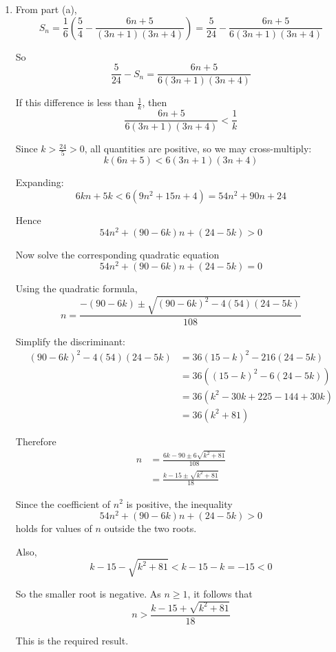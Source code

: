 \documentclass[leqno]{article}
\begin{document}
\begin{enumerate}[
  label=\textbf{\arabic*.},
  leftmargin=*,
  topsep=0pt,
  partopsep=0pt,
  parsep=0pt
]
\begin{tcolorbox}[colback=white, colframe=scarlet, title={\textbf{Solution}}, breakable, grow to left by=6mm, grow to right by=10mm]
\begin{enumerate}[label=\textbf{(\alph*)}]
Hence
\[
S_n=\frac{n(15n+17)}{8(3n+1)(3n+4)}
\]

  \item From part (a),
\[
S_n=\frac16\left(\frac54-\frac{6n+5}{(3n+1)(3n+4)}\right)
=\frac5{24}-\frac{6n+5}{6(3n+1)(3n+4)}
\]

So
\[
\frac5{24}-S_n=\frac{6n+5}{6(3n+1)(3n+4)}
\]

If this difference is less than \(\frac1k\), then
\[
\frac{6n+5}{6(3n+1)(3n+4)}<\frac1k
\]

Since \(k>\frac{24}{5}>0\), all quantities are positive, so we may cross-multiply:
\[
k(6n+5)<6(3n+1)(3n+4)
\]

Expanding:
\[
6kn+5k<6(9n^2+15n+4)=54n^2+90n+24
\]

Hence
\[
54n^2+(90-6k)n+(24-5k)>0
\]

Now solve the corresponding quadratic equation
\[
54n^2+(90-6k)n+(24-5k)=0
\]

Using the quadratic formula,
\[
n=\frac{-(90-6k)\pm\sqrt{(90-6k)^2-4(54)(24-5k)}}{108}
\]

Simplify the discriminant:
\[
\begin{aligned}
(90-6k)^2-4(54)(24-5k)
&=36(15-k)^2-216(24-5k) \\
&=36\left((15-k)^2-6(24-5k)\right) \\
&=36\left(k^2-30k+225-144+30k\right) \\
&=36(k^2+81)
\end{aligned}
\]

Therefore
\[
\begin{aligned}
n
&=\frac{6k-90\pm 6\sqrt{k^2+81}}{108} \\
&=\frac{k-15\pm\sqrt{k^2+81}}{18}
\end{aligned}
\]

Since the coefficient of \(n^2\) is positive, the inequality
\[
54n^2+(90-6k)n+(24-5k)>0
\]
holds for values of \(n\) outside the two roots.

Also,
\[
k-15-\sqrt{k^2+81}<k-15-k=-15<0
\]

So the smaller root is negative. As \(n\geq 1\), it follows that
\[
n>\frac{k-15+\sqrt{k^2+81}}{18}
\]

This is the required result.
\end{enumerate}
\end{tcolorbox}


\end{enumerate}
\end{document}
